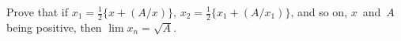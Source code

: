 Prove that if $x_{1} = \frac{1}{2}\{x + (A/x)\}$, $x_{2} = \frac{1}{2}\{x_{1} + (A/x_{1})\}$, and so on, $x$~and~$A$
being positive, then $\lim x_{n} = \sqrt{A}$.

